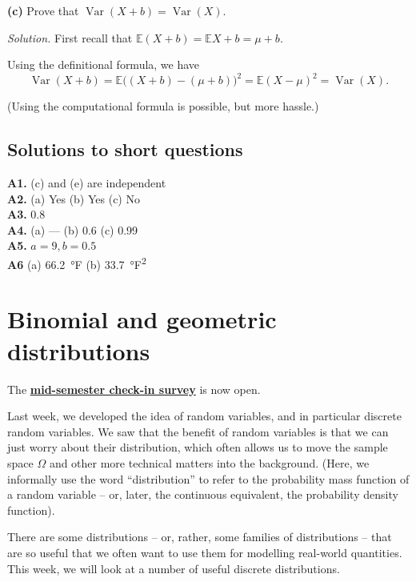\documentclass[
  a4paper,
]{book}
\theoremstyle{definition}
\theoremstyle{definition}
\theoremstyle{definition}
\theoremstyle{definition}
\theoremstyle{remark}
\begin{document}
\textbf{(c)} Prove that \(\operatorname{Var}(X+b) = \operatorname{Var}(X)\).

\begin{myanswers}
\emph{Solution.}
First recall that \(\mathbb E(X + b) = \mathbb EX + b = \mu + b\).

Using the definitional formula, we have
\[ \operatorname{Var}(X + b) = \mathbb E\big((X + b) - (\mu + b)\big)^2 = \mathbb E(X - \mu)^2 = \operatorname{Var}(X) . \]

(Using the computational formula is possible, but more hassle.)

\end{myanswers}

\hypertarget{P3-short-sols}{%
\section*{Solutions to short questions}\label{P3-short-sols}}

\textbf{A1.} (c) and (e) are independent\\
\textbf{A2.} (a) Yes (b) Yes (c) No\\
\textbf{A3.} 0.8\\
\textbf{A4.} (a) --- (b) 0.6 (c) 0.99\\
\textbf{A5.} \(a = 9, b = 0.5\)\\
\textbf{A6} (a) 66.2~°F (b) 33.7~°F\textsuperscript{2}

\hypertarget{L11-binomial-geometric}{%
\chapter{Binomial and geometric distributions}\label{L11-binomial-geometric}}

The \href{https://forms.office.com/e/8ETiji58Zi}{\textbf{mid-semester check-in survey}} is now open.

Last week, we developed the idea of random variables, and in particular discrete random variables. We saw that the benefit of random variables is that we can just worry about their distribution, which often allows us to move the sample space \(\Omega\) and other more technical matters into the background. (Here, we informally use the word ``distribution'' to refer to the probability mass function of a random variable -- or, later, the continuous equivalent, the probability density function).

There are some distributions -- or, rather, some families of distributions -- that are so useful that we often want to use them for modelling real-world quantities. This week, we will look at a number of useful discrete distributions.
\end{document}
